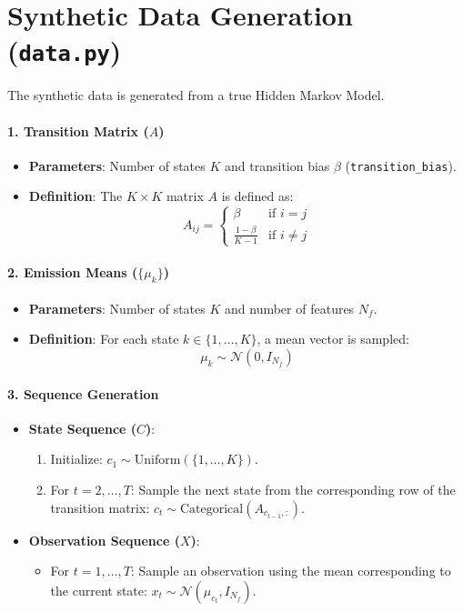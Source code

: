\documentclass[11pt, a4paper]{article}
\begin{document}
\section{Synthetic Data Generation (\texttt{data.py})}
The synthetic data is generated from a true Hidden Markov Model.

\paragraph{1. Transition Matrix ($A$)}
\begin{itemize}
    \item \textbf{Parameters}: Number of states $K$ and transition bias $\beta$ (\texttt{transition\_bias}).
    \item \textbf{Definition}: The $K \times K$ matrix $A$ is defined as:
    \[
    A_{ij} = \begin{cases} \beta & \text{if } i=j \\ \frac{1-\beta}{K-1} & \text{if } i \neq j \end{cases}
    \]
\end{itemize}

\paragraph{2. Emission Means ($\{\mu_k\}$)}
\begin{itemize}
    \item \textbf{Parameters}: Number of states $K$ and number of features $N_f$.
    \item \textbf{Definition}: For each state $k \in \{1, \dots, K\}$, a mean vector is sampled:
    \[ \mu_k \sim \mathcal{N}(0, I_{N_f}) \]
\end{itemize}

\paragraph{3. Sequence Generation}
\begin{itemize}
    \item \textbf{State Sequence ($C$)}:
    \begin{enumerate}
        \item Initialize: $c_1 \sim \text{Uniform}(\{1, \dots, K\})$.
        \item For $t=2, \dots, T$: Sample the next state from the corresponding row of the transition matrix: $c_t \sim \text{Categorical}(A_{c_{t-1}, :})$.
    \end{enumerate}
    \item \textbf{Observation Sequence ($X$)}:
    \begin{itemize}
        \item For $t=1, \dots, T$: Sample an observation using the mean corresponding to the current state: $x_t \sim \mathcal{N}(\mu_{c_t}, I_{N_f})$.
    \end{itemize}
\end{itemize}
\end{document}

